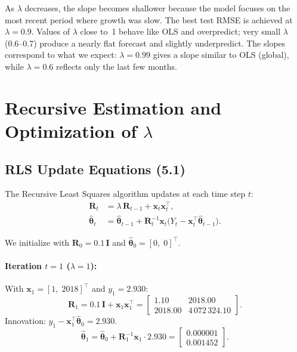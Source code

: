 \documentclass[11pt,a4paper]{article}
\begin{document}
As $\lambda$ decreases, the slope becomes shallower because the model focuses on the most recent period where growth was slow. The best test RMSE is achieved at $\lambda=0.9$. Values of $\lambda$ close to~1 behave like OLS and overpredict; very small $\lambda$ (0.6--0.7) produce a nearly flat forecast and slightly underpredict. The slopes correspond to what we expect: $\lambda=0.99$ gives a slope similar to OLS (global), while $\lambda=0.6$ reflects only the last few months.

\section{Recursive Estimation and Optimization of $\lambda$}

\subsection{RLS Update Equations (5.1)}

The Recursive Least Squares algorithm updates at each time step $t$:
\begin{align}
  \boldsymbol{R}_t &= \lambda\,\boldsymbol{R}_{t-1} + \boldsymbol{x}_t \boldsymbol{x}_t^\top, \label{eq:rls_R}\\
  \hat{\boldsymbol{\theta}}_t &= \hat{\boldsymbol{\theta}}_{t-1} + \boldsymbol{R}_t^{-1} \boldsymbol{x}_t \big(Y_t - \boldsymbol{x}_t^\top \hat{\boldsymbol{\theta}}_{t-1}\big). \label{eq:rls_theta}
\end{align}

We initialize with $\boldsymbol{R}_0 = 0.1\,\boldsymbol{I}$ and $\hat{\boldsymbol{\theta}}_0 = [0,\;0]^\top$.

\paragraph{Iteration $t=1$ ($\lambda=1$):}
With $\boldsymbol{x}_1 = [1,\;2018]^\top$ and $y_1 = 2.930$:
\[
  \boldsymbol{R}_1 = 0.1\,\boldsymbol{I} + \boldsymbol{x}_1\boldsymbol{x}_1^\top
  = \begin{bmatrix} 1.10 & 2018.00 \\ 2018.00 & 4\,072\,324.10 \end{bmatrix}.
\]
Innovation: $y_1 - \boldsymbol{x}_1^\top\hat{\boldsymbol{\theta}}_0 = 2.930$.
\[
  \hat{\boldsymbol{\theta}}_1 = \hat{\boldsymbol{\theta}}_0 + \boldsymbol{R}_1^{-1}\boldsymbol{x}_1 \cdot 2.930 = \begin{bmatrix} 0.000001 \\ 0.001452 \end{bmatrix}.
\]
\end{document}
